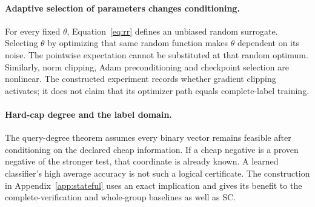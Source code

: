 \paragraph{Adaptive selection of parameters changes conditioning.}
For every fixed $\theta$, Equation~\eqref{eq:rr} defines an unbiased random surrogate. Selecting $\theta$ by optimizing that same random function makes $\theta$ dependent on its noise. The pointwise expectation cannot be substituted at that random optimum. Similarly, norm clipping, Adam preconditioning and checkpoint selection are nonlinear. The constructed experiment records whether gradient clipping activates; it does not claim that its optimizer path equals complete-label training.

\paragraph{Hard-cap degree and the label domain.}
The query-degree theorem assumes every binary vector remains feasible after conditioning on the declared cheap information. If a cheap negative is a proven negative of the stronger test, that coordinate is already known. A learned classifier's high average accuracy is not such a logical certificate. The construction in Appendix~\ref{app:stateful} uses an exact implication and gives its benefit to the complete-verification and whole-group baselines as well as SC.
